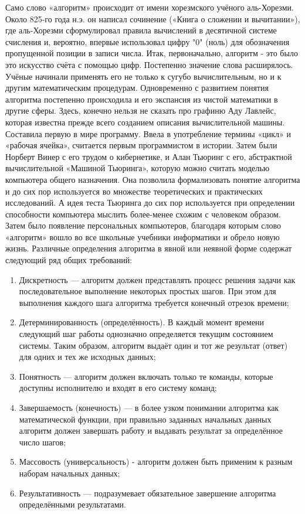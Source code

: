 \documentclass[fontsize=14bp]{report}
\begin{document}
Само слово «алгоритм» происходит от имени хорезмского учёного аль-Хорезми. Около 825-го года н.э. он написал сочинение («Книга о сложении и вычитании»), где аль-Хорезми сформулировал правила вычислений в десятичной системе счисления и, вероятно, впервые использовал цифру "0" (ноль) для обозначения пропущенной позиции в записи числа. Итак, первоначально, алгоритм - это было это искусство счёта с помощью цифр. Постепенно значение слова расширялось. Учёные начинали применять его не только к сугубо вычислительным, но и к другим математическим процедурам. Одновременно с развитием понятия алгоритма постепенно происходила и его экспансия из чистой математики в другие сферы. Здесь, конечно нельзя не сказать про графиню Аду Лавлейс, которая известна прежде всего созданием описания вычислительной машины. Составила первую в мире программу. Ввела в употребление термины «цикл» и «рабочая ячейка», считается первым программистом в истории. Затем были Норберт Винер с его трудом о кибернетике, и Алан Тьюринг с его, абстрактной вычислительной «Машиной Тьюринга», которую можно считать моделью компьютера общего назначения. Она позволила формализовать понятие алгоритма и до сих пор используется во множестве теоретических и практических исследований. А идея теста Тьюринга до сих пор используется при определении способности компьютера мыслить более-менее схожим с человеком образом. Затем было появление персональных компьютеров, благодаря которым слово «алгоритм» вошло во все школьные учебники информатики и обрело новую жизнь.
Различные определения алгоритма в явной или неявной форме содержат следующий ряд общих требований:
\begin{enumerate}
    \item Дискретность — алгоритм должен представлять процесс решения задачи как последовательное выполнение некоторых простых шагов. При этом для выполнения каждого шага алгоритма требуется конечный отрезок времени;
    \item Детерминированность (определённость). В каждый момент времени следующий шаг работы однозначно определяется текущим состоянием системы. Таким образом, алгоритм выдаёт один и тот же результат (ответ) для одних и тех же исходных данных;
    \item Понятность — алгоритм должен включать только те команды, которые доступны исполнителю и входят в его систему команд;
    \item Завершаемость (конечность) — в более узком понимании алгоритма как математической функции, при правильно заданных начальных данных алгоритм должен завершать работу и выдавать результат за определённое число шагов;
    \item Массовость (универсальность) - алгоритм должен быть применим к разным наборам начальных данных;
    \item Результативность — подразумевает обязательное завершение алгоритма определёнными результатами.
\end{enumerate}
\end{document}
